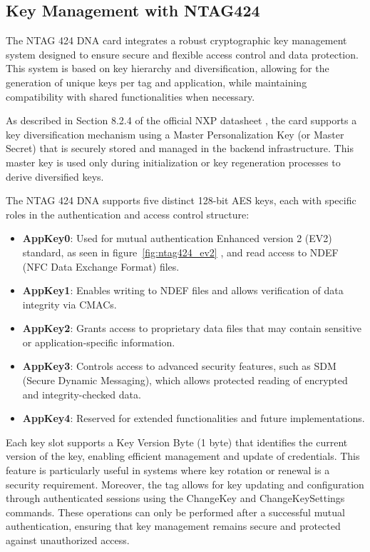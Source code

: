 \subsection{Key Management with NTAG424}
\label{subsec:keymanagement}

The NTAG 424 DNA card integrates a robust cryptographic key management system designed to ensure secure and flexible access control and data protection. This system is based on key hierarchy and diversification, allowing for the generation of unique keys per tag and application, while maintaining compatibility with shared functionalities when necessary.

As described in Section 8.2.4 of the official NXP datasheet \cite{ref42}, the card supports a key diversification mechanism using a Master Personalization Key (or Master Secret) that is securely stored and managed in the backend infrastructure. This master key is used only during initialization or key regeneration processes to derive diversified keys.

The NTAG 424 DNA supports five distinct 128-bit AES keys, each with specific roles in the authentication and access control structure:

\begin{itemize}
	\item \textbf{AppKey0}: Used for mutual authentication Enhanced version 2 (EV2) standard, as seen in figure~\ref{fig:ntag424_ev2} \cite{ref42}, and read access to NDEF (NFC Data Exchange Format) files.
	\item \textbf{AppKey1}: Enables writing to NDEF files and allows verification of data integrity via CMACs.
	\item \textbf{AppKey2}: Grants access to proprietary data files that may contain sensitive or application-specific information.
	\item \textbf{AppKey3}: Controls access to advanced security features, such as SDM (Secure Dynamic Messaging), which allows protected reading of encrypted and integrity-checked data.
	\item \textbf{AppKey4}: Reserved for extended functionalities and future implementations.
\end{itemize}

Each key slot supports a Key Version Byte (1 byte) that identifies the current version of the key, enabling efficient management and update of credentials. This feature is particularly useful in systems where key rotation or renewal is a security requirement. Moreover, the tag allows for key updating and configuration through authenticated sessions using the ChangeKey and ChangeKeySettings commands. These operations can only be performed after a successful mutual authentication, ensuring that key management remains secure and protected against unauthorized access.

